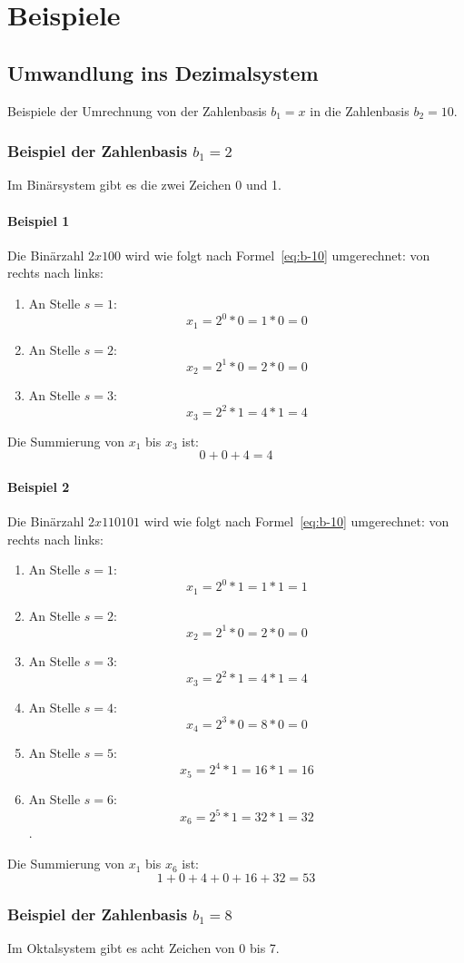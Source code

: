 \chapter{Beispiele}
\section{Umwandlung ins Dezimalsystem}
Beispiele der Umrechnung von der Zahlenbasis $b_{1}=x$ in die Zahlenbasis $b_{2}=10$.
\subsection{Beispiel der Zahlenbasis $b_{1}=2$}
Im Binärsystem gibt es die zwei Zeichen 0 und 1. 
\subsubsection{Beispiel 1}
Die Binärzahl $2x100$ wird wie folgt nach Formel~\ref{eq:b-10} umgerechnet: von rechts nach links:
\begin{enumerate}
    \item An Stelle $s=1$: \[x_{1} = 2^{0} * 0 = 1 * 0 = 0\]
    \item An Stelle $s=2$: \[x_{2} = 2^{1} * 0 = 2 * 0 = 0\]
    \item An Stelle $s=3$: \[x_{3} = 2^{2} * 1 = 4 * 1 = 4\]
\end{enumerate}
Die Summierung von $x_{1}$ bis $x_{3}$ ist:
\[0 + 0 + 4 = 4\]
\subsubsection{Beispiel 2}
Die Binärzahl $2x110101$ wird wie folgt nach Formel~\ref{eq:b-10} umgerechnet: von rechts nach links:
\begin{enumerate}
    \item An Stelle $s=1$: \[x_{1} = 2^{0} * 1 = 1 * 1 = 1\]
    \item An Stelle $s=2$: \[x_{2} = 2^{1} * 0 = 2 * 0 = 0\]
    \item An Stelle $s=3$: \[x_{3} = 2^{2} * 1 = 4 * 1 = 4\]
    \item An Stelle $s=4$: \[x_{4} = 2^{3} * 0 = 8 * 0 = 0\]
    \item An Stelle $s=5$: \[x_{5} = 2^{4} * 1 = 16 * 1 = 16\]
    \item An Stelle $s=6$: \[x_{6} = 2^{5} * 1 = 32 * 1 = 32\]. 
\end{enumerate}
Die Summierung von $x_{1}$ bis $x_{6}$ ist:
\[1 + 0 + 4 + 0 + 16 + 32 = 53\]
\subsection{Beispiel der Zahlenbasis $b_{1}=8$}
Im Oktalsystem gibt es acht Zeichen von 0 bis 7. 

